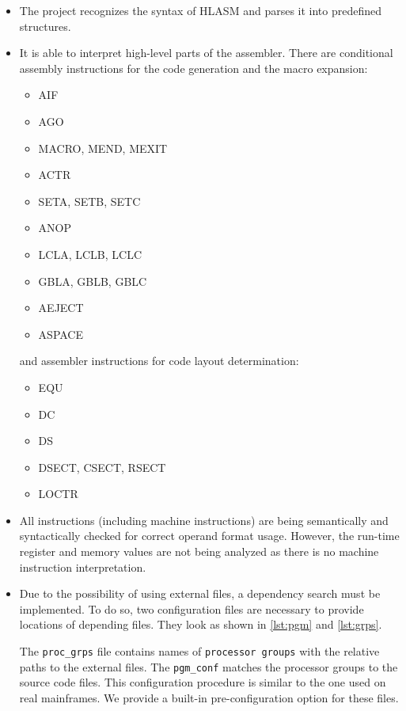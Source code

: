 \begin{itemize}
\item The project recognizes the syntax of HLASM and parses it into predefined structures. 

\item It is able to interpret high-level parts of the assembler. There are conditional assembly instructions for the code generation and the macro expansion:
\begin{itemize}
    \item AIF
    \item AGO
    \item MACRO, MEND, MEXIT
    \item ACTR
    \item SETA, SETB, SETC
    \item ANOP
    \item LCLA, LCLB, LCLC
    \item GBLA, GBLB, GBLC
    \item AEJECT
    \item ASPACE
\end{itemize}
and assembler instructions for code layout determination:
\begin{itemize}
    \item EQU 
    \item DC 
    \item DS 
    \item DSECT, CSECT, RSECT 
    \item LOCTR
\end{itemize}

\item All instructions (including machine instructions) are being semantically and syntactically checked for correct operand format usage. However, the run-time register and memory values are not being analyzed as there is no machine instruction interpretation.

\item Due to the possibility of using external files, a dependency search must be implemented. To do so, two configuration files are necessary to provide locations of depending files. They look as shown in \cref{lst:pgm} and \cref{lst:grps}. 

The \texttt{proc\_grps} file contains names of \texttt{processor groups} with the relative paths to the external files. The \texttt{pgm\_conf} matches the processor groups to the source code files. This configuration procedure is similar to the one used on real mainframes. We provide a built-in pre-configuration option for these files.


\end{itemize}
